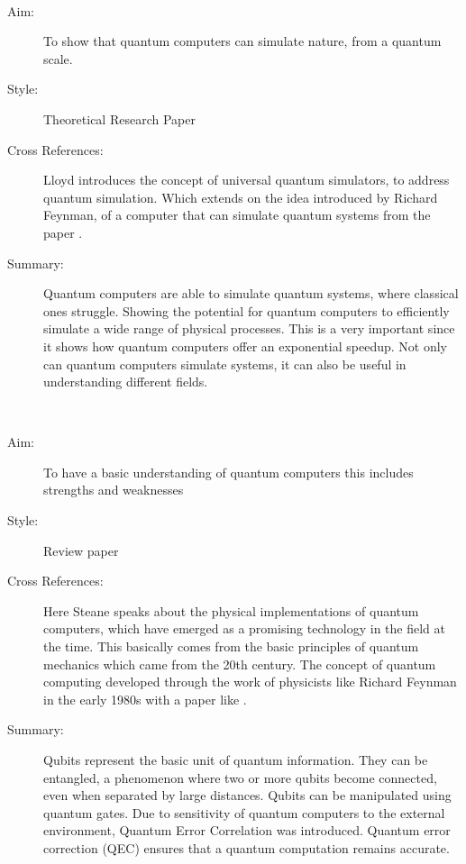 \documentclass{Assignment}
\begin{document}
\newpage
\cite{UQS}~

\begin{description}
	\item[Aim:] To show that quantum computers can simulate nature, from a quantum scale.
	
	\item [Style:] Theoretical Research Paper
	
	\item [Cross References:] Lloyd introduces the concept of universal quantum simulators, to address quantum simulation. 
	Which extends on the idea introduced by Richard Feynman, of a computer that can simulate quantum systems from the paper \cite{feynman1982simulating}. 
	
	\item[Summary:] Quantum computers are able to simulate quantum systems, where classical ones struggle. 
	Showing the potential for quantum computers to efficiently simulate a wide range of physical processes.	
	This is a very important since it shows how quantum computers offer an exponential speedup.
	Not only can quantum computers simulate systems, it can also be useful in understanding different fields.
	
	
\end{description}
\newpage
\cite{AndrewSteane}~
\begin{description}
	\item[Aim:] To have a basic understanding of quantum computers this includes strengths and weaknesses
	
	\item [Style:] Review paper
	
	\item [Cross References:] Here Steane speaks about the physical implementations of quantum computers, which have emerged as a promising technology in the field at the time. 
	This basically comes from  the basic principles of quantum mechanics which came from the 20th century.
	The concept of quantum computing developed through the work of physicists like Richard Feynman in the early 1980s with a paper like \cite{feynman1982simulating}. 
	
	
	\item[Summary:]
	Qubits represent the basic unit of quantum information.
	They can be entangled, a phenomenon where two or more qubits become connected, even when separated by large distances.
	Qubits can be manipulated using quantum gates.
	Due to sensitivity of quantum computers to the external environment, Quantum Error Correlation was introduced.
	Quantum error correction (QEC) ensures that a quantum computation remains  accurate.
\end{description}
	 	\newpage
	 	
\end{document}

